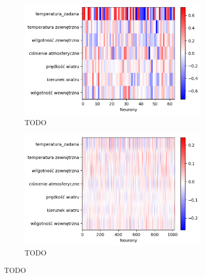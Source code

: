 \documentclass[a4paper,twoside,12pt]{book}
\begin{document}
\begin{figure}[!h]
  \centering
  \begin{subfigure}{0.4\textwidth}
    \includegraphics[width=\textwidth]{img/heatmap1_zdodatkowym.png}
    \caption{TODO}
    \label{fig:lewy-gorny}
  \end{subfigure}
  \hfill
  \begin{subfigure}{0.4\textwidth}
    \includegraphics[width=\textwidth]{img/heatmap2_zdodatkowym.png}
    \caption{TODO}
    \label{fig:prawy-gorny}
  \end{subfigure}
  \caption{TODO}
  \label{fig:wiele-rysunkow}
\end{figure}
\end{document}
